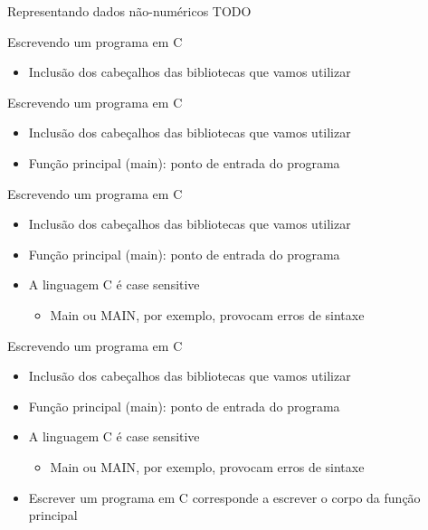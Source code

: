 \documentclass[t, aspectratio=169]{beamer}
\begin{document}
\begin{frame}[label={sec:orgb8b7875}]{Representando dados não-numéricos}
TODO
\end{frame}

\begin{frame}[label={sec:orgaa63b5d}]{Escrevendo um programa em C}
\begin{itemize}
\item Inclusão dos cabeçalhos das bibliotecas que vamos utilizar
\end{itemize}
\end{frame}

\begin{frame}[label={sec:org2a0527b}]{Escrevendo um programa em C}
\begin{itemize}
\item Inclusão dos cabeçalhos das bibliotecas que vamos utilizar
\item Função principal (\alert{main}): ponto de entrada do programa
\end{itemize}
\end{frame}

\begin{frame}[label={sec:orgd398b8e}]{Escrevendo um programa em C}
\begin{itemize}
\item Inclusão dos cabeçalhos das bibliotecas que vamos utilizar
\item Função principal (\alert{main}): ponto de entrada do programa
\item A linguagem C é \alert{case sensitive}
\begin{itemize}
\item \alert{Main} ou \alert{MAIN}, por exemplo, provocam erros de sintaxe
\end{itemize}
\end{itemize}
\end{frame}

\begin{frame}[label={sec:org3478f31}]{Escrevendo um programa em C}
\begin{itemize}
\item Inclusão dos cabeçalhos das bibliotecas que vamos utilizar
\item Função principal (\alert{main}): ponto de entrada do programa
\item A linguagem C é \alert{case sensitive}
\begin{itemize}
\item \alert{Main} ou \alert{MAIN}, por exemplo, provocam erros de sintaxe
\end{itemize}
\item Escrever um programa em C corresponde a escrever o \alert{corpo} da função principal
\end{itemize}
\end{frame}
\end{document}
